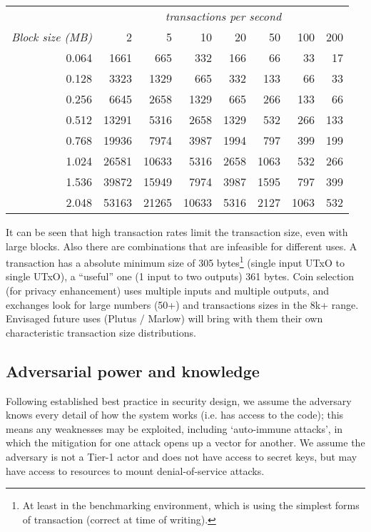 \documentclass[11pt,a4paper]{article}
\begin{document}
\begin{table}
  \caption{Transaction size as a function of block size and transactions per
  second}
  \label{table:transaction-size}
\begin{longtable}[]{r|rrrrrrr}
\toprule
  & \multicolumn{7}{c}{\textit{transactions per second}}\tabularnewline
\textit{Block size (MB)} & 2 & 5 & 10 & 20 & 50 & 100 & 200\tabularnewline
\midrule
\endhead
0.064 & 1661 & 665 & 332 & 166 & 66 & 33 & 17\tabularnewline
0.128 & 3323 & 1329 & 665 & 332 & 133 & 66 & 33\tabularnewline
0.256 & 6645 & 2658 & 1329 & 665 & 266 & 133 & 66\tabularnewline
0.512 & 13291 & 5316 & 2658 & 1329 & 532 & 266 & 133\tabularnewline
0.768 & 19936 & 7974 & 3987 & 1994 & 797 & 399 & 199\tabularnewline
1.024 & 26581 & 10633 & 5316 & 2658 & 1063 & 532 & 266\tabularnewline
1.536 & 39872 & 15949 & 7974 & 3987 & 1595 & 797 & 399\tabularnewline
2.048 & 53163 & 21265 & 10633 & 5316 & 2127 & 1063 & 532\tabularnewline
\bottomrule
\end{longtable}
\end{table}

It can be seen that high transaction rates limit the transaction size,
even with large blocks. Also there are combinations that are infeasible
for different uses. A transaction has a absolute minimum size of 305 
bytes\footnote{At least in the benchmarking
environment, which is using the simplest forms of transaction 
(correct at time of writing).} (single
input UTxO to single UTxO), a ``useful'' one (1 input to two outputs) 361
bytes. Coin selection (for privacy enhancement) uses multiple inputs and
multiple outputs, and exchanges look for large numbers (50+) and
transactions sizes in the 8k+ range. Envisaged future uses (Plutus /
Marlow) will bring with them their own characteristic transaction size
distributions.

\subsection{Adversarial power and knowledge}
\label{adversarial-power-and-knowledge}

Following established best practice in security design, we assume the
adversary knows every detail of how the system works (i.e. has access to
the code); this means any weaknesses may be exploited, including
`auto-immune attacks', in which the mitigation for one attack opens up a
vector for another. We assume the adversary is not a Tier-1 actor and
does not have access to secret keys, but may have access to resources to
mount denial-of-service attacks.
\end{document}
